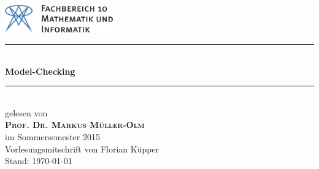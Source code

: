 \begin{titlepage}
	\newcommand{\HRule}{\rule{\linewidth}{0.8mm}} 

	\center 
 
	\begin{minipage}{0.4\textwidth}
	\begin{flushleft}
	\end{flushleft}
	\end{minipage}
	\hfill
	\begin{minipage}{0.4\textwidth}
	\begin{flushright}
	\vspace*{0.3cm}
	\includegraphics[height=1.2cm,keepaspectratio]{../!config/Bilder/fb10logo.pdf} \
	\end{flushright}
	\end{minipage}

	\vspace{2cm}
	
	\HRule \\[0.8cm]
	{ \huge \sffamily\bfseries Model-Checking}\\[0.4cm] %
	\HRule \\[1cm]
 
	{\LARGE gelesen von} \\[.7cm]
	\textsc{\LARGE \textbf{Prof. Dr. Markus Müller-Olm}}\\[.7cm]
	{\LARGE im Sommersemester 2015}\\[2cm]


	\vfill
	{\Large Vorlesungsmitschrift von Florian Küpper} \\[.5cm]
	{\large Stand: \today}
	
\end{titlepage}
\cleardoubleemptypage